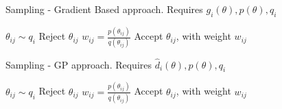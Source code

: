 

\begin{minipage}{0.46\textwidth}
\begin{algorithm}[H]
    \centering
    \caption{Sampling - Gradient Based approach. Requires $g_i(\theta), p(\theta), q_i$}\label{alg:sampling_GB}
    \begin{algorithmic}[1]
          \State $\theta_{ij} \sim q_i$
            \State Reject $\theta_{ij}$
          \Else {}
            \State $w_{ij} = \frac{p(\theta_{ij})}{q(\theta_{ij})}$
            \State Accept $\theta_{ij}$, with weight $w_{ij}$
          \EndIf
      \EndFor
      \EndFor
    \end{algorithmic}
\end{algorithm}
\end{minipage}
\hfill
\begin{minipage}{0.46\textwidth}
\begin{algorithm}[H]
    \centering
    \caption{Sampling - GP approach. Requires $\hat{d}_i(\theta), p(\theta), q_i$}\label{alg:sampling_GP}
    \begin{algorithmic}[1]
          \State $\theta_{ij} \sim q_i$
            \State Reject $\theta_{ij}$
          \Else {}
            \State $w_{ij} = \frac{p(\theta_{ij})}{q(\theta_{ij})}$
            \State Accept $\theta_{ij}$, with weight $w_{ij}$
          \EndIf
      \EndFor
      \EndFor
    \end{algorithmic}
\end{algorithm}
\end{minipage}
